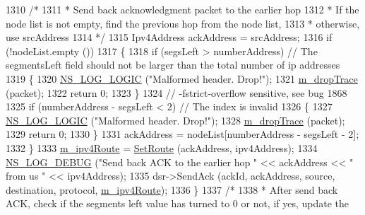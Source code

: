 \begin{DoxyCode}
1310           \textcolor{comment}{/*}
1311 \textcolor{comment}{           * Send back acknowledgment packet to the earlier hop}
1312 \textcolor{comment}{           * If the node list is not empty, find the previous hop from the node list,}
1313 \textcolor{comment}{           * otherwise, use srcAddress}
1314 \textcolor{comment}{           */}
1315           Ipv4Address ackAddress = srcAddress;
1316           \textcolor{keywordflow}{if} (!nodeList.empty ())
1317             \{
1318                 \textcolor{keywordflow}{if} (segsLeft > numberAddress) \textcolor{comment}{// The segmentsLeft field should not be larger than the total
       number of ip addresses}
1319                   \{
1320                     \hyperlink{group__logging_ga88acd260151caf2db9c0fc84997f45ce}{NS\_LOG\_LOGIC} (\textcolor{stringliteral}{"Malformed header. Drop!"});
1321                     \hyperlink{classns3_1_1dsr_1_1DsrOptions_a176bbc9efb58b6d750c14b9b03c525c4}{m\_dropTrace} (packet);
1322                     \textcolor{keywordflow}{return} 0;
1323                   \}
1324                 \textcolor{comment}{// -fstrict-overflow sensitive, see bug 1868}
1325                 \textcolor{keywordflow}{if} (numberAddress - segsLeft < 2) \textcolor{comment}{// The index is invalid}
1326                    \{
1327                       \hyperlink{group__logging_ga88acd260151caf2db9c0fc84997f45ce}{NS\_LOG\_LOGIC} (\textcolor{stringliteral}{"Malformed header. Drop!"});
1328                       \hyperlink{classns3_1_1dsr_1_1DsrOptions_a176bbc9efb58b6d750c14b9b03c525c4}{m\_dropTrace} (packet);
1329                       \textcolor{keywordflow}{return} 0;
1330                    \}
1331                    ackAddress = nodeList[numberAddress - segsLeft - 2];
1332             \}
1333            \hyperlink{classns3_1_1dsr_1_1DsrOptions_ae4785209eae1d101cb8bd2d3b392d2ad}{m\_ipv4Route} = \hyperlink{classns3_1_1dsr_1_1DsrOptions_af749b76db4626ae64bc37001a5353b99}{SetRoute} (ackAddress, ipv4Address);
1334            \hyperlink{group__logging_ga413f1886406d49f59a6a0a89b77b4d0a}{NS\_LOG\_DEBUG} (\textcolor{stringliteral}{"Send back ACK to the earlier hop "} << ackAddress << \textcolor{stringliteral}{" from us "} << 
      ipv4Address);
1335            dsr->SendAck (ackId, ackAddress, source, destination, protocol, 
      \hyperlink{classns3_1_1dsr_1_1DsrOptions_ae4785209eae1d101cb8bd2d3b392d2ad}{m\_ipv4Route});
1336         \}
1337       \textcolor{comment}{/*}
1338 \textcolor{comment}{       * After send back ACK, check if the segments left value has turned to 0 or not, if yes, update the
}
\end{DoxyCode}
